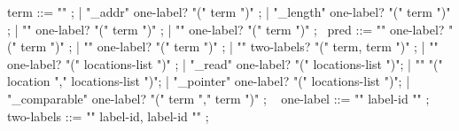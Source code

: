 \begin{syntax}
  term ::= "\null" ;
        | "\base_addr" { one-label? } "(" term ")" ;
        | "\block_length" { one-label? } "(" term ")" ;
        | "\offset" { one-label? } "(" term ")" ;
        | { "\allocation" one-label? "(" term ")" };
       \
  pred ::= { "\allocable" one-label? "(" term ")" };
       | "\freeable" { one-label? } "(" term ")" ;
       | { "\fresh" two-labels? "(" term, term ")" };
       | "\valid" { one-label? } "(" locations-list ")" ;
       | "\valid_read" { one-label? } "(" locations-list ")";
       | "\separated" "(" location "," locations-list ")";
       | "\object_pointer" { one-label? } "(" locations-list ")";
       | { "\pointer_comparable" one-label? "(" term "," term ")" };
       \
  { one-label } ::= { "{" label-id "}" } ;
       \
  { two-labels } ::= { "{" label-id, label-id "}" } ;
\end{syntax}
